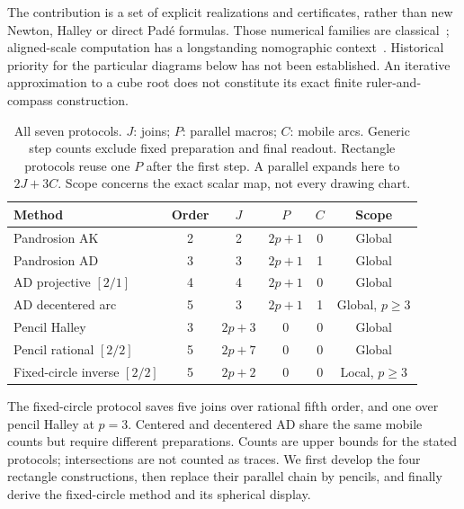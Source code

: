\documentclass[11pt,a4paper]{article}
\theoremstyle{remark}\newtheorem{remark}[theorem]{Remark}
\begin{document}
The contribution is a set of explicit realizations and certificates, rather than new Newton, Halley or direct Pad\'e formulas. Those numerical families are classical~\cite{dlmf38,laszkiewicz2009,zietakSlides2009}; aligned-scale computation has a longstanding nomographic context~\cite{docagne1925}. Historical priority for the particular diagrams below has not been established. An iterative approximation to a cube root does not constitute its exact finite ruler-and-compass construction.

\begin{table}[H]\centering\small
\caption{All seven protocols. $J$: joins; $P$: parallel macros; $C$: mobile arcs. Generic step counts exclude fixed preparation and final readout. Rectangle protocols reuse one $P$ after the first step. A parallel expands here to $2J+3C$. Scope concerns the exact scalar map, not every drawing chart.}
\begin{tabularx}{\linewidth}{@{}Xccccc@{}}\toprule
Method & Order & $J$ & $P$ & $C$ & Scope\\\midrule
Pandrosion AK & 2 & 2 & $2p+1$ & 0 & Global\\
Pandrosion AD & 3 & 3 & $2p+1$ & 1 & Global\\
AD projective $[2/1]$ & 4 & 4 & $2p+1$ & 0 & Global\\
AD decentered arc & 5 & 3 & $2p+1$ & 1 & Global, $p\ge3$\\\midrule
Pencil Halley & 3 & $2p+3$ & 0 & 0 & Global\\
Pencil rational $[2/2]$ & 5 & $2p+7$ & 0 & 0 & Global\\
Fixed-circle inverse $[2/2]$ & 5 & $2p+2$ & 0 & 0 & Local, $p\ge3$\\\bottomrule
\end{tabularx}\label{tab:main}
\end{table}

The fixed-circle protocol saves five joins over rational fifth order, and one over pencil Halley at $p=3$. Centered and decentered AD share the same mobile counts but require different preparations. Counts are upper bounds for the stated protocols; intersections are not counted as traces. We first develop the four rectangle constructions, then replace their parallel chain by pencils, and finally derive the fixed-circle method and its spherical display.
\end{document}

